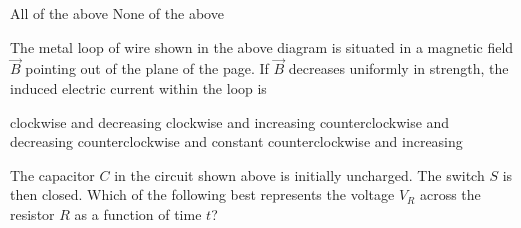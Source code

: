 \documentclass[12pt]{../../oss-apphys-exam}
\begin{document}
\begin{questions}
\begin{oneparchoices}
    \choice
    \hspace{.3in}
    
    \choice
    \hspace{.2in}
    
    \choice All of the above
    \choice None of the above
  \end{oneparchoices}
  
  \newpage
  
  \question The metal loop of wire shown in the above diagram is situated in a
  magnetic field $\vec B$ pointing out of the plane of the page. If $\vec B$
  decreases uniformly in strength, the induced electric current within the loop
  is
  \begin{choices}
    \choice clockwise and decreasing
    \choice clockwise and increasing
    \choice counterclockwise and decreasing
    \choice counterclockwise and constant
    \choice counterclockwise and increasing
  \end{choices}
  \newpage
  
  \question The capacitor $C$ in the circuit shown above is initially
  uncharged. The switch $S$ is then closed. Which of the following best
  represents the voltage $V_R$ across the resistor $R$ as a function of time
  $t$?
  
  \begin{oneparchoices}
    \choice


\end{oneparchoices}
\end{questions}
\end{document}
